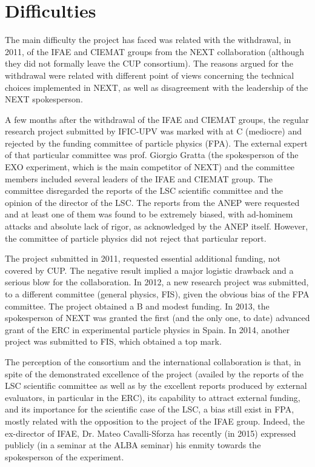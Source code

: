 \documentclass[a4paper,11pt,oneside]{article}
\begin{document}
\section{\bf \textsf{ Difficulties}} 

The main difficulty the project has faced was related with the withdrawal, in 2011, of the IFAE and CIEMAT groups from the NEXT collaboration (although they did not formally leave the CUP consortium). The reasons argued for the withdrawal were related with different point of views concerning the technical choices implemented in NEXT, as well as disagreement with the leadership of the NEXT spokesperson.

A few months after the withdrawal of the IFAE and CIEMAT groups, the regular research project submitted by IFIC-UPV was marked with at C (mediocre) and rejected by the funding committee of particle physics (FPA). The external expert of that particular committee was prof. Giorgio Gratta (the spokesperson of the EXO experiment, which is the main competitor of NEXT) and the committee members included several leaders of the IFAE and CIEMAT group. The committee disregarded the reports of the LSC scientific committee and the opinion of the director of the LSC. The reports from the ANEP were requested and at least one of them was found to be extremely biased, with ad-hominem attacks and absolute lack of rigor, as acknowledged by the ANEP itself. However, the committee of particle physics did not reject that particular report.

The project submitted in 2011, requested essential additional funding, not covered by CUP. The negative result implied a major logistic drawback and a serious blow for the collaboration. In 2012, a new research project was submitted, to a different committee (general physics, FIS), given the obvious bias of the FPA committee. The project obtained a B and modest funding. In 2013, the spokesperson of NEXT was granted the first (and the only one, to date) advanced grant of the ERC in experimental particle physics in Spain. In 2014, another project was submitted to FIS, which obtained a top mark. 

The perception of the consortium and the international collaboration is that, in spite of the demonstrated excellence of the project (availed by the reports of the LSC scientific committee as well as by the excellent reports produced by external evaluators, in particular in the ERC), its capability to attract external funding, and its importance for the scientific case of the LSC, a bias still exist in FPA, mostly related with the opposition to the project of the IFAE group. Indeed, the ex-director of IFAE, Dr. Mateo Cavalli-Sforza has recently (in 2015) expressed publicly (in a seminar at the ALBA seminar) his enmity towards the spokesperson of the experiment. 
\end{document}
